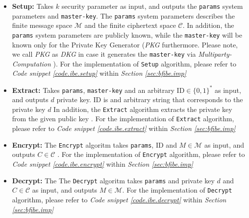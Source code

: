 \begin{itemize}
	
	\item[] \textbf{Setup:} Takes $k$ security parameter as input, and outputs the \lstinline{params} system parameters and \lstinline{master-key}.
	The \lstinline{params} system parameters describes the finite message space
	$\mathcal{M}$ and the finite ciphertext space $\mathcal{C}$.
	In addition, the \lstinline{params} system parameters are publicly known,
	while the \lstinline{master-key} will be known only for the Private Key Generator (\textit{PKG} furthermore. Please note, we call \textit{PKG} as \textit{DKG} in case it generates the  \lstinline{master-key} via \textit{Multiparty-Computation} ).\cite{BF01} For the implementation of  \lstinline|Setup| algorithm,
	please refer to \textit{Code snippet  \ref{code.ibe.setup}}  within \textit{Section \ref{sec:bfibe.imp}}
	
	\item[] \textbf{Extract:} Takes \lstinline{params}, \lstinline{master-key} and an arbitrary $\mathrm{ID} \in \{0,1\}^*$ as input,
	and outputs $d$ private key. $\mathrm{ID}$ is and arbitrary string that corresponds to the private key $d$
	In addition, the \lstinline{Extract} algorithm extracts the private key from the given public key \cite{BF01}. For the implementation of \lstinline|Extract| algorithm, please refer to \textit{Code snippet \ref{code.ibe.extract} }  within \textit{Section \ref{sec:bfibe.imp}}
	
	\item[] \textbf{Encrypt:} The \lstinline{Encrypt} algoritm takes \lstinline{params}, $\mathrm{ID}$ and $M \in \mathcal{M}$ as input,
	and outputs $C \in \mathcal{C}$ \cite{BF01}. For the implementation of \lstinline|Encrypt| algorithm, please refer to \textit{Code snippet \ref{code.ibe.encrypt} }  within \textit{Section \ref{sec:bfibe.imp}}
	
	\item[] \textbf{Decrypt:} The The \lstinline{Decrypt} algoritm takes \lstinline{params} and private key $d$ and $C \in \mathcal{C}$ as input,
	and outputs $M \in \mathcal{M}$\cite{BF01}. For the implementation of \lstinline|Decrypt| algorithm, please refer to \textit{Code snippet \ref{code.ibe.decrypt} }  within \textit{Section \ref{sec:bfibe.imp}}
\end{itemize}

